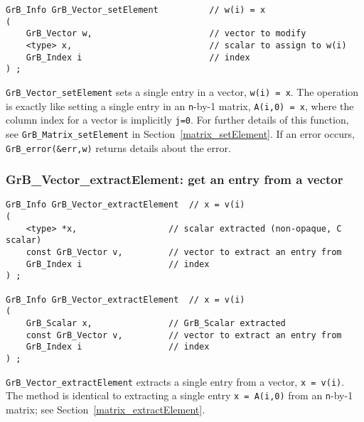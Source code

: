 \documentclass[12pt]{article}
\begin{document}
{\begin{mdframed}[userdefinedwidth=6in]
{\footnotesize
\begin{verbatim}
GrB_Info GrB_Vector_setElement          // w(i) = x
(
    GrB_Vector w,                       // vector to modify
    <type> x,                           // scalar to assign to w(i)
    GrB_Index i                         // index
) ;
\end{verbatim} } \end{mdframed}

\verb'GrB_Vector_setElement' sets a single entry in a vector, \verb'w(i) = x'.
The operation is exactly like setting a single entry in an \verb'n'-by-1
matrix, \verb'A(i,0) = x', where the column index for a vector is implicitly
\verb'j=0'.  For further details of this function, see
\verb'GrB_Matrix_setElement' in Section~\ref{matrix_setElement}.
If an error occurs, \verb'GrB_error(&err,w)' returns details about the error.

\subsubsection{{\sf GrB\_Vector\_extractElement:} get an entry from a vector}
\label{vector_extractElement}

\begin{mdframed}[userdefinedwidth=6in]
{\footnotesize
\begin{verbatim}
GrB_Info GrB_Vector_extractElement  // x = v(i)
(
    <type> *x,                  // scalar extracted (non-opaque, C scalar)
    const GrB_Vector v,         // vector to extract an entry from
    GrB_Index i                 // index
) ;

GrB_Info GrB_Vector_extractElement  // x = v(i)
(
    GrB_Scalar x,               // GrB_Scalar extracted
    const GrB_Vector v,         // vector to extract an entry from
    GrB_Index i                 // index
) ;
\end{verbatim} } \end{mdframed}

\verb'GrB_Vector_extractElement' extracts a single entry from a vector,
\verb'x = v(i)'.  The method is identical to extracting a single entry
\verb'x = A(i,0)' from an \verb'n'-by-1 matrix; see
Section~\ref{matrix_extractElement}.

}
\end{document}
